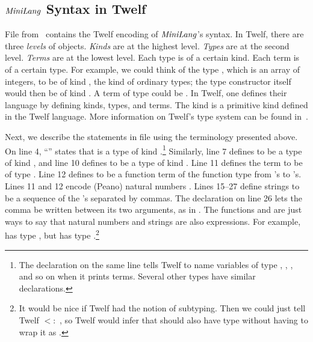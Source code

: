 \subsection{\texorpdfstring{$\mathit{MiniLang}$}{MiniLang} Syntax in Twelf}
File  from~\cite{twelf-tutorial} contains
the Twelf encoding of $\mathit{MiniLang}$'s syntax.
In Twelf, there are three \emph{levels} of objects.
\emph{Kinds} are at the highest level.
\emph{Types} are at the second level.
\emph{Terms} are at the lowest level.
Each type is of a certain kind.
Each term is of a certain type.
For example, we could think of
the type , which is an
array of integers, to be of kind , the kind of
ordinary types; the type constructor  itself would
then be of kind .
A term of type  could be
\code{[1, 2, 3, 4]}.
In Twelf, one defines their language by defining
kinds, types, and terms.
The kind  is a primitive kind defined
in the Twelf language.
More information on Twelf's type system can be
found in~\cite{HARPER:2007:MML:1296837.1296842}.

Next, we describe the statements in file 
using the terminology presented above.
On line 4,
``'' states that  is a type
of kind .\footnote{The  declaration
on the same line tells Twelf to name variables of type 
, , , and so on when it prints terms.
Several other types have similar  declarations.}
Similarly, line 7 defines  to be a type
of kind ,
and line 10 defines  to be a type
of kind .
Line 11 defines the term  to be of
type .
Line 12 defines  to be a function term
of the function type from 's to 's.
Lines 11 and 12 encode (Peano) natural numbers
.
Lines 15--27 define strings to be a sequence of
the 's separated by commas.
The  declaration on line 26 lets the comma
be written between its two arguments, as in .
The functions  and 
are just ways to say that natural
numbers and strings are also expressions.
For example,  has type ,
but  has type .\footnote{It would be nice if Twelf had the notion of
subtyping.
Then we could just tell Twelf  $<:$ ,
so Twelf would infer that  should also have type
 without having to wrap it as .}

